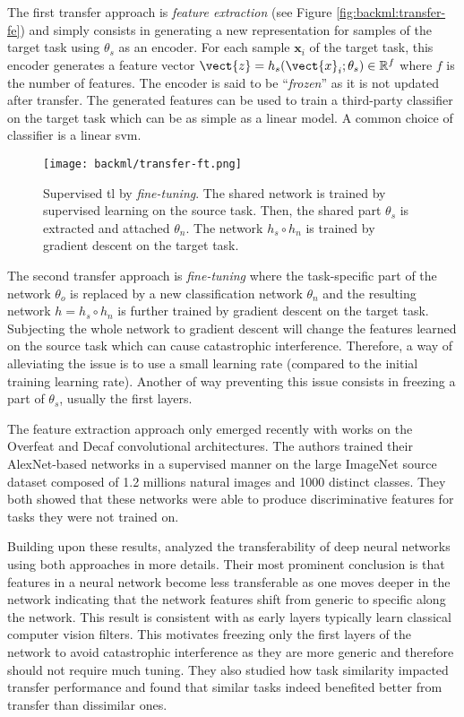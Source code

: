 The first transfer approach is \textit{feature extraction} (see Figure \ref{fig:backml:transfer-fe}) and simply consists in generating a new representation for samples of the target task using $\theta_s$ as an encoder. For each sample $\mathbf{x}_i$ of the target task, this encoder generates a feature vector $\vect{z} = h_s(\vect{x}_i;\theta_s) \in \mathbb{R}^f$ where $f$ is the number of features. The encoder is said to be ``\textit{frozen}'' as it is not updated after transfer. The generated features can be used to train a third-party classifier on the target task which can be as simple as a linear model. A common choice of classifier is a linear \acrshort{svm}. 

\begin{figure}
  \centering
  \texttt{[image: backml/transfer-ft.png]}
  \caption{Supervised \acrlong{tl} by \textit{fine-tuning}. The shared network is trained by supervised learning on the source task. Then, the shared part $\theta_s$ is extracted and attached $\theta_n$. The network $h_s \circ h_n$ is trained by gradient descent on the target task.}
  \label{fig:backml:transfer-ft}
\end{figure}

The second transfer approach is \textit{fine-tuning} where the task-specific part of the network $\theta_{o}$ is replaced by a new classification network $\theta_{n}$ and the resulting network $h = h_s \circ h_n$ is further trained by gradient descent on the target task. Subjecting the whole network to gradient descent will change the features learned on the source task which can cause catastrophic interference. Therefore, a way of alleviating the issue is to use a small learning rate (compared to the initial training learning rate). Another of way preventing this issue consists in freezing a part of $\theta_s$, usually the first layers. 

The feature extraction approach only emerged recently with works on the Overfeat \parencite{sermanet2013overfeat, razavian2014cnn} and Decaf \parencite{donahue2014decaf} convolutional architectures. The authors trained their AlexNet-based networks in a supervised manner on the large ImageNet source dataset composed of 1.2 millions natural images and 1000 distinct classes. They both showed that these networks were able to produce discriminative features for tasks they were not trained on.

Building upon these results, \parencite{yosinski2014transferable} analyzed the transferability of deep neural networks using both approaches in more details. Their most prominent conclusion is that features in a neural network become less transferable as one moves deeper in the network indicating that the network features shift from generic to specific along the network. This result is consistent with \parencite{zeiler2014visualizing} as early layers typically learn classical computer vision filters. This motivates freezing only the first layers of the network to avoid catastrophic interference as they are more generic and therefore should not require much tuning. They also studied how task similarity impacted transfer performance and found that similar tasks indeed benefited better from transfer than dissimilar ones.

